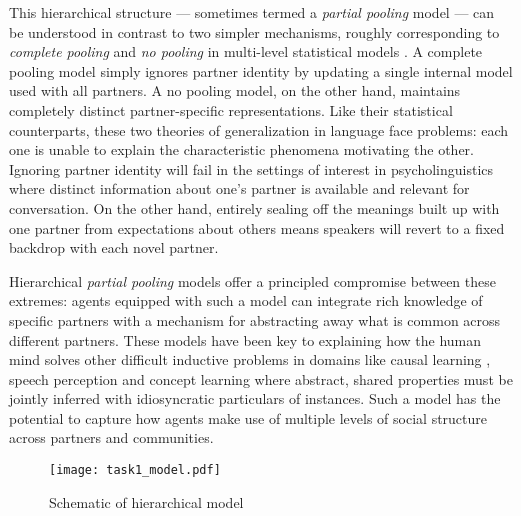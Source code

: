 This hierarchical structure --- sometimes termed a \emph{partial pooling} model --- can be understood in contrast to two simpler mechanisms, roughly corresponding to \emph{complete pooling} and \emph{no pooling} in multi-level statistical models \cite{gelman2006data}.
A complete pooling model simply ignores partner identity by updating a single internal model used with all partners. 
A no pooling model, on the other hand, maintains completely distinct partner-specific representations.
Like their statistical counterparts, these two theories of generalization in language face problems: each one is unable to explain the characteristic phenomena motivating the other. 
Ignoring partner identity will fail in the settings of interest in psycholinguistics where distinct information about one’s partner is available and relevant for conversation. 
On the other hand, entirely sealing off the meanings built up with one partner from expectations about others means speakers will revert to a fixed backdrop with each novel partner.

Hierarchical \emph{partial pooling} models offer a principled compromise between these extremes: agents equipped with such a model can integrate rich knowledge of specific partners with a mechanism for abstracting away what is common across different partners.
These models have been key to explaining how the human mind solves other difficult inductive problems in domains like causal learning \cite{KempGoodmanTenenbaum10_LearningToLearn,GoodmanUllmanTenenbaum11_TheoryOfCausality}, speech perception \cite{KleinschmidtJaeger15_RobustSpeechPerception} and concept learning \cite{KempPerforsTenenbaum07_HBM} where abstract, shared properties must be jointly inferred with idiosyncratic particulars of instances. 
Such a model has the potential to capture how agents make use of multiple levels of social structure across partners and communities. 

\begin{figure}
\centering
    \texttt{[image: task1\_model.pdf]}
  \caption{Schematic of hierarchical model}
  \label{fig:task1model}
\end{figure}

